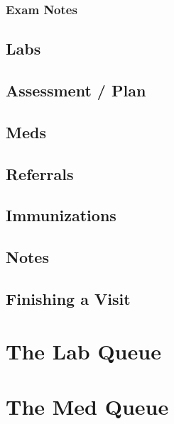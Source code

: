\subsubsection{Exam Notes}
\subsection{Labs}
\subsection{Assessment / Plan}
\subsection{Meds}
\subsection{Referrals}
\subsection{Immunizations}
\subsection{Notes}
\subsection{Finishing a Visit}

\section{The Lab Queue}

\section{The Med Queue}

